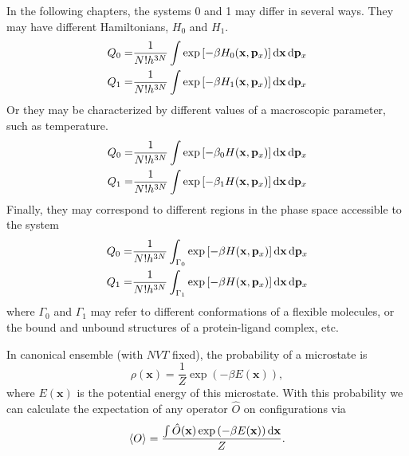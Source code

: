 In the following chapters, the systems 0 and 1 may differ in several ways. They may have different Hamiltonians, $H_0$ and $H_1$. 
\begin{align}
	Q_0=&\frac{1}{N!h^{3N}}\int\exp{\left[-\beta H_0(\mathbf{x},\mathbf{p}_x)\right]}\mathop{}\!\mathrm{d} \mathbf{x}\mathop{}\!\mathrm{d} \mathbf{p}_x\\
	Q_1=&\frac{1}{N!h^{3N}}\int\exp{\left[-\beta H_1(\mathbf{x},\mathbf{p}_x)\right]}\mathop{}\!\mathrm{d} \mathbf{x}\mathop{}\!\mathrm{d} \mathbf{p}_x
\end{align}
Or they may be characterized by different values of a macroscopic parameter, such as temperature. 
\begin{align}
	Q_0=&\frac{1}{N!h^{3N}}\int\exp{\left[-\beta_0 H(\mathbf{x},\mathbf{p}_x)\right]}\mathop{}\!\mathrm{d} \mathbf{x}\mathop{}\!\mathrm{d} \mathbf{p}_x\\
	Q_1=&\frac{1}{N!h^{3N}}\int\exp{\left[-\beta_1 H(\mathbf{x},\mathbf{p}_x)\right]}\mathop{}\!\mathrm{d} \mathbf{x}\mathop{}\!\mathrm{d} \mathbf{p}_x
\end{align}
Finally, they may correspond to different regions in the phase space accessible to the system
\begin{align}
Q_0=&\frac{1}{N!h^{3N}}\int_{\Gamma_0}\exp{\left[-\beta H(\mathbf{x},\mathbf{p}_x)\right]}\mathop{}\!\mathrm{d} \mathbf{x}\mathop{}\!\mathrm{d} \mathbf{p}_x\\
Q_1=&\frac{1}{N!h^{3N}}\int_{\Gamma_1}\exp{\left[-\beta H(\mathbf{x},\mathbf{p}_x)\right]}\mathop{}\!\mathrm{d} \mathbf{x}\mathop{}\!\mathrm{d} \mathbf{p}_x
\end{align}
where $\Gamma_0$ and $\Gamma_1$ may refer to different conformations of a flexible molecules, or the bound and unbound structures of a protein-ligand complex, etc.

In canonical ensemble (with $NVT$ fixed), the probability of a microstate is
\begin{equation}
\rho(\mathbf{x})=\frac{1}{Z}\exp{(-\beta E(\mathbf{x}))},
\end{equation}
where $E(\mathbf{x})$ is the potential energy of this microstate. With this probability we can calculate the expectation of any operator $\hat{O}$ on configurations via
\begin{equation}
\left<O\right>=\frac{\int \hat{O}(\mathbf{x})\exp{(-\beta E(\mathbf{x}))}\mathop{}\!\mathrm{d}\mathbf{x}}{Z}.
\end{equation}

